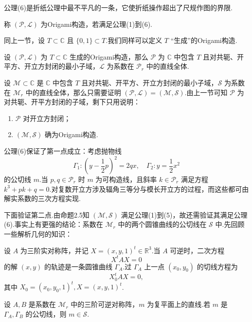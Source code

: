 公理(6)是折纸公理中最不平凡的一条，它使折纸操作超出了尺规作图的界限.

\begin{definition}
    称 $(\mathcal{P},\mathcal{L})$ 为Origami构造，若满足公理(1)到(6).
\end{definition}

同上一节，设 $T\subset\mathbb{C}$ 且 $\{0,1\}\subset T$.我们同样可以定义 $T$ “生成”的Origami构造.

\begin{theorem}
    设 $(\mathcal{P},\mathcal{L})$ 为 $T\subset\mathbb{C}$ 生成的Origami构造，那么 $\mathcal{P}$ 为 $\mathbb{C}$ 中包含 $T$ 且对共轭、开平方、开立方封闭的最小子域，$\mathcal{L}$ 为系数在 $\mathcal{P}_r$ 中的直线全体.
\end{theorem}

设 $\mathcal{M}\subset\mathbb{C}$ 是 $\mathbb{C}$ 中包含 $T$ 且对共轭、开平方、开立方封闭的最小子域，$\mathcal{S}$ 为系数在 $\mathcal{M}_r$ 中的直线全体，那么只需要证明 $(\mathcal{P},\mathcal{L})=(\mathcal{M},\mathcal{S})$.由上一节可知 $\mathcal{P}$ 为对共轭、开平方封闭的子域，剩下只用说明：

\begin{enumerate}[wide,itemindent=2em,label=\bullet]
    \item $\mathcal{P}$ 对开立方封闭；
    \item $(\mathcal{M},\mathcal{S})$ 确为Origami构造.
\end{enumerate}

公理(6)保证了第一点成立：考虑抛物线
$$
\Gamma_1:(y-\frac{1}{2}p)^2=2qx,\quad \Gamma_2:y=\frac{1}{2}x^2
$$
的公切线 $m$.当 $p,q\in\mathcal{P}_r$ 时 $m$ 为可构造线，且斜率 $k\in\mathcal{P}_r$ 满足方程 $k^3+pk+q=0$.对复数开立方涉及辐角三等分与模长开立方的过程，而这些都可由解实系数的三次方程实现.

下面验证第二点.由命题2.5知 $(\mathcal{M},\mathcal{S})$ 满足公理(1)到(5)，故还需验证其满足公理(6).事实上有更强的结论：系数在 $\mathcal{M}_r$ 中的两个圆锥曲线的公切线在 $\mathcal{S}$ 中.先回顾一些解析几何的知识：

设 $A$ 为三阶实对称阵，并记 $X=(x,y,1)^t\in\mathbb{R}^3$.当 $A$ 可逆时，二次方程
$$
X^tAX=0
$$
的解 $(x,y)$ 的轨迹是一条圆锥曲线 $\Gamma_A$.过 $\Gamma_A$ 上一点 $(x_0,y_0)$ 的切线方程为
$$
X_0^tAX=0,
$$
其中 $X_0=(x_0,y_0,1)^t,X=(x,y,1)^t$.

\begin{proposition}
    设 $A,B$ 是系数在 $\mathcal{M}_r$ 中的三阶可逆对称阵，$m$ 为复平面上的直线.若 $m$ 是 $\Gamma_A,\Gamma_B$ 的公切线，则 $m\in\mathcal{S}$.
\end{proposition}

